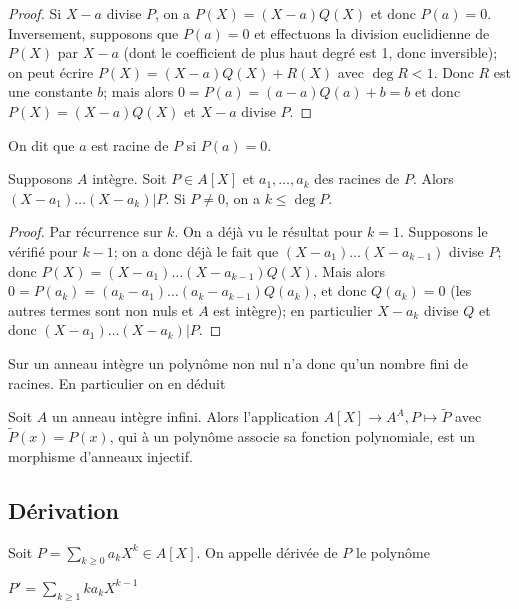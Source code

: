 \begin{proof}
Si $X - a$ divise $P$, on a $P(X) = (X - a)Q(X)$ et donc $P(a) = 0$. Inversement, supposons que $P(a) = 0$ et effectuons la division euclidienne de $P(X)$ par $X - a$ (dont le coefficient de plus haut degré est 1, donc inversible); on peut écrire $P(X) = (X - a)Q(X) + R(X)$ avec $\deg R < 1$. Donc $R$ est une constante $b$; mais alors $0 = P(a) = (a - a)Q(a) + b = b$ et donc $P(X) = (X - a)Q(X)$ et $X - a$ divise $P$.
\end{proof}

\begin{rem}
On dit que $a$ est racine de $P$ si $P(a) = 0$.
\end{rem}

\begin{thm}
Supposons $A$ intègre. Soit $P \in A[X]$ et $a_1,\ldots,a_k$ des racines de $P$. Alors $(X - a_1)\ldots(X - a_k) | P$. Si $P \neq 0$, on a $k \leq \deg P$.
\end{thm}

\begin{proof}
Par récurrence sur $k$. On a déjà vu le résultat pour $k = 1$. Supposons le vérifié pour $k - 1$; on a donc déjà le fait que $(X - a_1)\ldots(X - a_{k-1})$ divise $P$; donc $P(X) = (X - a_1)\ldots(X - a_{k-1})Q(X)$. Mais alors $0 = P(a_k) = (a_k - a_1)\ldots(a_k - a_{k-1})Q(a_k)$, et donc $Q(a_k) = 0$ (les autres termes sont non nuls et $A$ est intègre); en particulier $X - a_k$ divise $Q$ et donc $(X - a_1)\ldots(X - a_k) | P$.
\end{proof}

\begin{rem}
Sur un anneau intègre un polynôme non nul n'a donc qu'un nombre fini de racines. En particulier on en déduit
\end{rem}

\begin{thm}
Soit $A$ un anneau intègre infini. Alors l'application $A[X] \rightarrow A^A, P \mapsto \tilde{P}$ avec $\tilde{P}(x) = P(x)$, qui à un polynôme associe sa fonction polynomiale, est un morphisme d'anneaux injectif.
\end{thm}

\subsection{Dérivation}

\begin{de}
Soit $P = \sum_{k \geq 0} a_k X^k \in A[X]$. On appelle dérivée de $P$ le polynôme

$P' = \sum_{k \geq 1} k a_k X^{k-1}$
\end{de}

